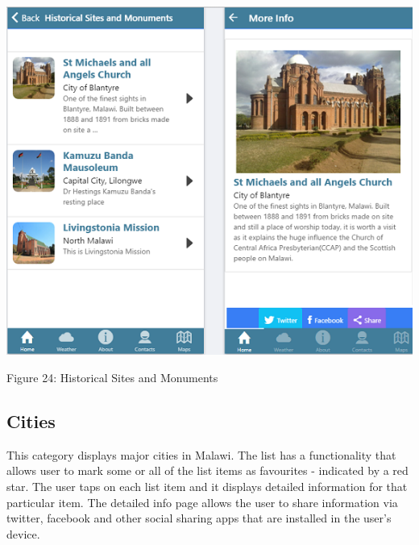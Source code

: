 \begin{center}    
	\includegraphics{img/history.png}
\end{center}
\begin{center}
	Figure 24: Historical Sites and Monuments 
\end{center}
\paragraph{}

\subsection{Cities}
This category displays major cities in Malawi. The list has a functionality that allows user to mark some or all of the list items as favourites - indicated by a red star. The user taps on each list item and it displays detailed information for that particular item. The detailed info page allows the user to share information via twitter, facebook and other social sharing apps that are installed in the user’s device.

